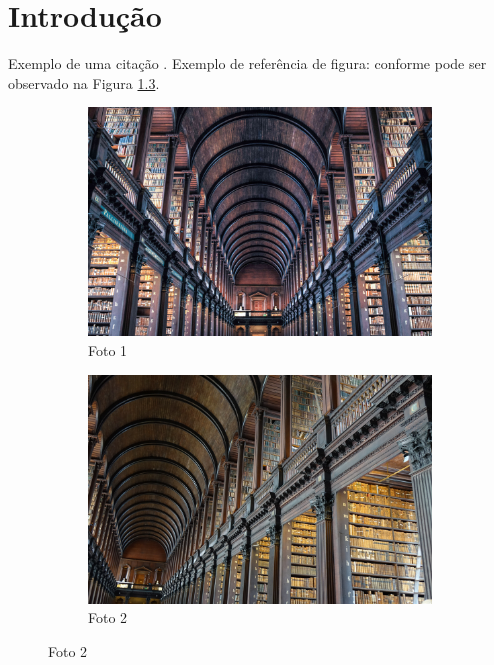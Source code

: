 \chapter[Introdução]{Introdução}
\label{chap:introduction}

Exemplo de uma citação \cite{HennessyPatterson2012}. Exemplo de referência de
figura: conforme pode ser observado na Figura \ref{fig:biblioteca}.

\lipsum [5 - 10]

\begin{figure}[t]
  \caption{Imagens de uma biblioteca.}
  \begin{subfigure}{.5\linewidth}
    \centering
    \includegraphics[width=\textwidth]{images/library1.jpg}
    \caption{Foto 1}
    \label{fig:foto1}
  \end{subfigure}
  \begin{subfigure}{.5\linewidth}
    \centering
    \includegraphics[width=\textwidth]{images/library2.jpg}
    \caption{Foto 2}
    \label{fig:foto2}
  \end{subfigure}
  \label{fig:biblioteca}
\end{figure}


